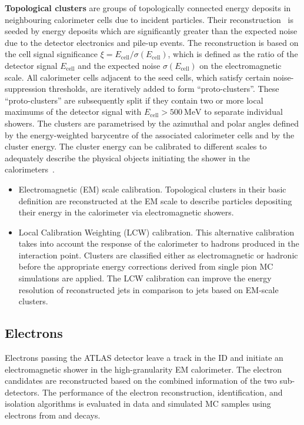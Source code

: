 \textbf{Topological clusters} are groups of topologically connected energy deposits in neighbouring calorimeter cells due to incident particles. Their reconstruction~\cite{PERF-2014-07} is seeded by energy deposits which are significantly greater than the expected noise due to the detector electronics and pile-up events. The reconstruction is based on the cell signal significance \(\xi = E_{\text{cell}} / \sigma(E_{\text{cell}})\), which is defined as the ratio of the detector signal \(E_{\text{cell}}\) and the expected noise \(\sigma(E_{\text{cell}})\) on the electromagnetic scale. All calorimeter cells adjacent to the seed cells, which satisfy certain noise-suppression thresholds, are iteratively added to form ``proto-clusters''. These ``proto-clusters'' are subsequently split if they contain two or more local maximums of the detector signal with \(E_{\text{cell}} > \SI{500}{\mega\electronvolt}\) to separate individual showers.
The clusters are parametrised by the azimuthal and polar angles defined by the energy-weighted barycentre of the associated calorimeter cells and by the cluster energy.
The cluster energy can be calibrated to different scales to adequately describe the physical objects initiating the shower in the calorimeters~\cite{PERF-2014-02}.
\begin{itemize}
	\item Electromagnetic (EM) scale calibration. Topological clusters in their basic definition are reconstructed at the EM scale to describe particles depositing their energy in the calorimeter via electromagnetic showers.
	\item Local Calibration Weighting (LCW) calibration. This alternative calibration~\cite{PERF-2011-03} takes into account the response of the calorimeter to hadrons produced in the interaction point. Clusters are classified either as electromagnetic or hadronic before the appropriate energy corrections derived from single pion MC simulations are applied. The LCW calibration can improve the energy resolution of reconstructed jets in comparison to jets based on EM-scale clusters.
\end{itemize}

\subsection{Electrons}
\label{sec:methods:event-reconstruction:electrons}
Electrons passing the ATLAS detector leave a track in the ID and initiate an electromagnetic shower in the high-granularity EM calorimeter. The electron candidates are reconstructed based on the combined information of the two sub-detectors.
The performance of the electron reconstruction, identification, and isolation algorithms is evaluated in data and simulated MC samples using electrons from \HepProcess{\PZ \to \Pem \Pep} and \HepProcess{\PJgy \to \Pem \Pep} decays.

